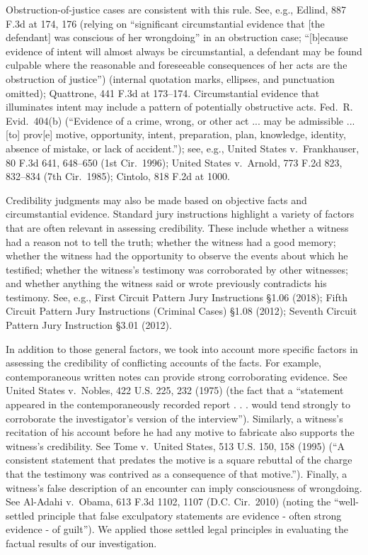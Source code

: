 Obstruction-of-justice cases are consistent with this rule.
See, e.g., Edlind, 887 F.3d at 174, 176 (relying on “significant circumstantial evidence that [the defendant] was conscious of her wrongdoing” in an obstruction case; “[b]ecause evidence of intent will almost always be circumstantial, a defendant may be found culpable where the reasonable and foreseeable consequences of her acts are the obstruction of justice”) (internal quotation marks, ellipses, and punctuation omitted);
Quattrone, 441 F.3d at 173--174.
Circumstantial evidence that illuminates intent may include a pattern of potentially obstructive acts. Fed.~R. Evid.~404(b) (“Evidence of a crime, wrong, or other act ... may be admissible ... [to] prov[e] motive, opportunity, intent, preparation, plan, knowledge, identity, absence of mistake, or lack of accident.”);
see, e.g., United States v.\ Frankhauser, 80 F.3d 641, 648--650 (1st Cir.~1996);
United States v.\ Arnold, 773 F.2d 823, 832--834 (7th Cir.~1985);
Cintolo, 818 F.2d at 1000.

Credibility judgments may also be made based on objective facts and circumstantial evidence.
Standard jury instructions highlight a variety of factors that are often relevant in assessing credibility.
These include whether a witness had a reason not to tell the truth; whether the witness had a good memory;
whether the witness had the opportunity to observe the events about which he testified;
whether the witness’s testimony was corroborated by other witnesses;
and whether anything the witness said or wrote previously contradicts his testimony.
See, e.g., First Circuit Pattern Jury Instructions \S 1.06 (2018);
Fifth Circuit Pattern Jury Instructions (Criminal Cases) \S 1.08 (2012);
Seventh Circuit Pattern Jury Instruction \S 3.01 (2012).

In addition to those general factors, we took into account more specific factors in assessing the credibility of conflicting accounts of the facts.
For example, contemporaneous written notes can provide strong corroborating evidence. See United States v.\ Nobles, 422 U.S. 225, 232 (1975) (the fact that a “statement appeared in the contemporaneously recorded report . . . would tend strongly to corroborate the investigator’s version of the interview”).
Similarly, a witness’s recitation of his account before he had any motive to fabricate also supports the witness’s credibility.
See Tome v.\ United States, 513 U.S. 150, 158 (1995) (“A consistent statement that predates the motive is a square rebuttal of the charge that the testimony was contrived as a consequence of that motive.”).
Finally, a witness’s false description of an encounter can imply consciousness of wrongdoing.
See Al-Adahi v.\ Obama, 613 F.3d 1102, 1107 (D.C. Cir.~2010) (noting the “well-settled principle that false exculpatory statements are evidence - often strong evidence - of guilt”).
We applied those settled legal principles in evaluating the factual results of our investigation.
